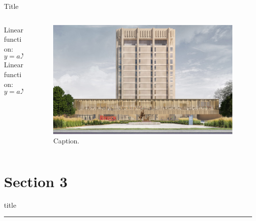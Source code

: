 \documentclass{beamer} %
\begin{document}
\begin{frame}{Title}
    \begin{columns}[T] %
\begin{column}{.5\textwidth}
Linear function: 
        \begin{equation}
            y=aX+b
        \end{equation}
Linear function: 
        \begin{equation}
            y=aX+b
        \end{equation}
\end{column}%
\hfill%
\begin{column}{.5\textwidth}
\begin{figure}
        \centering
        \includegraphics[scale=0.05]{Figures/Brock-LINC-Project-South-Elevation.jpg}
        \caption{Caption.}
        \label{fig:label4}
    \end{figure}
\end{column}%
\end{columns}
    
    
\end{frame}


\section{Section 3}
    \begin{frame}[plain]
        \vfill
      \centering
      \begin{beamercolorbox}[sep=8pt,center,shadow=true,rounded=true]{title}
        \insertsectionhead\par%
        \color{blue}\noindent\rule{10cm}{1pt}
      \end{beamercolorbox}
      \vfill
  \end{frame}
\end{document}
